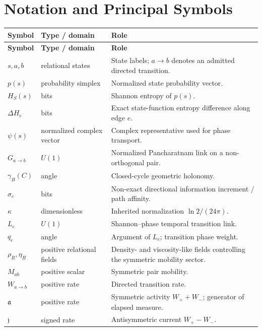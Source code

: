\chapter*{Notation and Principal Symbols}

\small
\setlength{\LTpre}{0pt}
\setlength{\LTpost}{0pt}
\begin{longtable}{p{}p{}p{}}
\toprule
\textbf{Symbol} & \textbf{Type / domain} & \textbf{Role} \\
\midrule
\endfirsthead
\toprule
\textbf{Symbol} & \textbf{Type / domain} & \textbf{Role} \\
\midrule
\endhead
\(s,a,b\) & relational states & State labels; \(a\to b\) denotes an admitted directed transition. \\
\(p(s)\) & probability simplex & Normalized state probability vector. \\
\(H_S(s)\) & bits & Shannon entropy of \(p(s)\). \\
\(\Delta H_e\) & bits & Exact state-function entropy difference along edge \(e\). \\
\(\psi(s)\) & normalized complex vector & Complex representative used for phase transport. \\
\(G_{a\to b}\) & \(U(1)\) & Normalized Pancharatnam link on a non-orthogonal pair. \\
\(\gamma_B(C)\) & angle & Closed-cycle geometric holonomy. \\
\(\sigma_e\) & bits & Non-exact directional information increment / path affinity. \\
\(\kappa\) & dimensionless & Inherited normalization \(\ln2/(24\pi)\). \\
\(L_e\) & \(U(1)\) & Shannon--phase temporal transition link. \\
\(q_e\) & angle & Argument of \(L_e\); transition phase weight. \\
\(\rho_R,\eta_R\) & positive relational fields & Density- and viscosity-like fields controlling the symmetric mobility sector. \\
\(M_{ab}\) & positive scalar & Symmetric pair mobility. \\
\(W_{a\to b}\) & positive rate & Directed transition rate. \\
\(\mathfrak a\) & positive rate & Symmetric activity \(W_++W_-\); generator of elapsed measure. \\
\(\mathfrak j\) & signed rate & Antisymmetric current \(W_+-W_-\). \\

\end{longtable}
